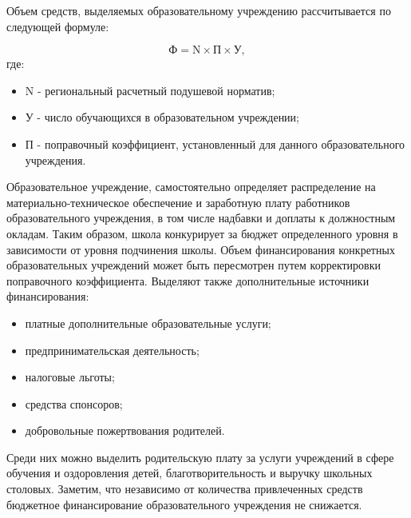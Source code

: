                  
Объем средств, выделяемых образовательному учреждению рассчитывается по следующей формуле:

$$
    \text{Ф}= \text{N} \times \text{П} \times \text{У},
$$    
где:
\begin{itemize}
    \item  N - региональный расчетный подушевой норматив;
    \item У - число обучающихся в образовательном учреждении;
    \item П - поправочный коэффициент, установленный для данного образовательного учреждения.
\end{itemize}
            
Образовательное учреждение, самостоятельно определяет распределение на материально-техническое обеспечение и заработную плату работников образовательного учреждения, в том числе надбавки и доплаты к должностным окладам.
Таким образом, школа конкурирует за бюджет определенного уровня в зависимости от уровня подчинения школы.
Объем финансирования конкретных образовательных учреждений может быть пересмотрен путем корректировки поправочного коэффициента.
Выделяют также дополнительные источники финансирования:
\begin{itemize}
    \item платные дополнительные образовательные услуги;
    \item предпринимательская деятельность; 
    \item налоговые льготы;
    \item средства спонсоров;
    \item добровольные пожертвования родителей.
\end{itemize}
 
Среди них можно выделить родительскую плату за услуги учреждений в сфере обучения и оздоровления детей, благотворительность и выручку школьных столовых.
Заметим, что независимо от количества привлеченных средств бюджетное финансирование образовательного учреждения не снижается.
